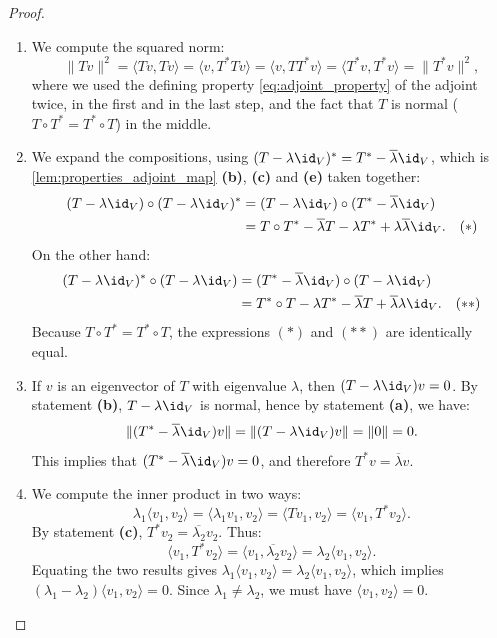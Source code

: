 \begin{proof}
\begin{enumerate}[label=\textbf{(\alph*)}]
    \item We compute the squared norm:
    \[
        \|Tv\|^2 = \langle Tv, Tv \rangle = \langle v, T^*Tv \rangle = \langle v, TT^*v \rangle = \langle T^*v, T^*v \rangle = \|T^*v\|^2,
    \]
    where we used the defining property \eqref{eq:adjoint_property} of the adjoint twice, in the first and in the last step, and the fact that $T$ is normal ($T \circ T^* = T^* \circ T$) in the middle.
    
    \item We expand the compositions, using $(T - \lambda \id_V)^* = T^* - \overline{\lambda} \id_V$, which is \cref{lem:properties_adjoint_map} \textbf{(b)}, \textbf{(c)} and \textbf{(e)} taken together:
    \begin{align*}
        (T - \lambda \id_V) \circ (T - \lambda \id_V)^* &= (T - \lambda \id_V) \circ (T^* - \overline{\lambda} \id_V) \\
        &= T \circ T^* - \overline{\lambda} T - \lambda T^* + \lambda \overline{\lambda} \id_V. \quad (*)
    \end{align*}
    On the other hand:
    \begin{align*}
        (T - \lambda \id_V)^* \circ (T - \lambda \id_V) &= (T^* - \overline{\lambda} \id_V) \circ (T - \lambda \id_V) \\
        &= T^* \circ T - \lambda T^* - \overline{\lambda} T + \overline{\lambda} \lambda \id_V. \quad (**)
    \end{align*}
    Because $T \circ T^* = T^* \circ T$, the expressions $(*)$ and $(**)$ are identically equal.
    
    \item If $v$ is an eigenvector of $T$ with eigenvalue $\lambda$, then $(T - \lambda \id_V)v = 0$. By statement \textbf{(b)}, $T - \lambda \id_V$ is normal, hence by statement \textbf{(a)}, we have:
    \[
        \|(T^* - \overline{\lambda} \id_V)v\| = \|(T - \lambda \id_V)v\| = \|0\| = 0.
    \]
    This implies that $(T^* - \overline{\lambda} \id_V)v = 0$, and therefore $T^*v = \overline{\lambda}v$.
    
    \item We compute the inner product in two ways:
    \[
        \lambda_1 \langle v_1, v_2 \rangle = \langle \lambda_1 v_1, v_2 \rangle = \langle Tv_1, v_2 \rangle = \langle v_1, T^*v_2 \rangle.
    \]
    By statement \textbf{(c)}, $T^*v_2 = \overline{\lambda_2}v_2$. Thus:
    \[
        \langle v_1, T^*v_2 \rangle = \langle v_1, \overline{\lambda_2} v_2 \rangle = \lambda_2 \langle v_1, v_2 \rangle.
    \]
    Equating the two results gives $\lambda_1 \langle v_1, v_2 \rangle = \lambda_2 \langle v_1, v_2 \rangle$, which implies $(\lambda_1 - \lambda_2) \langle v_1, v_2 \rangle = 0$. 
    Since $\lambda_1 \neq \lambda_2$, we must have $\langle v_1, v_2 \rangle = 0$.
\end{enumerate}
\end{proof}

